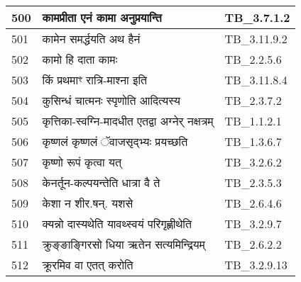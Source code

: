 \documentclass[17pt]{extarticle}
\begin{document}
\begin{longtable}{||p{0.4in}||p{4.9in}||p{0.9in}||}
    500 & कामप्रीता एनं कामा अनुप्रयान्ति & TB\_3.7.1.2       \\
    
    \hline
        
    501 & कामेन समर्द्धयति अथ हैनं & TB\_3.11.9.2       \\
    
    \hline
        
    502 & कामो हि दाता कामः & TB\_2.2.5.6       \\
    
    \hline
        
    503 & किं प्रथमाꣳ रात्रि{-}माश्ना इति & TB\_3.11.8.4       \\
    
    \hline
        
    504 & कुसिन्धं चात्मनः स्पृणोति आदित्यस्य & TB\_2.3.7.2       \\
    
    \hline
        
    505 & कृत्तिका{-}स्वग्नि{-}मादधीत एतद्वा अग्नेर् नक्षत्रम् & TB\_1.1.2.1       \\
    
    \hline
        
    506 & कृष्णलं कृष्णलं ॅवाजसृद्भ्यः प्रयच्छति & TB\_1.3.6.7       \\
    
    \hline
        
    507 & कृष्णो रूपं कृत्वा यत् & TB\_3.2.6.2       \\
    
    \hline
        
    508 & केनर्तून{-}कल्पयन्तेति धात्रा वै ते & TB\_2.3.5.3       \\
    
    \hline
        
    509 & केशा न शीर.षन्. यशसे & TB\_2.6.4.6       \\
    
    \hline
        
    510 & क्यन्नो दास्यथेति यावथ्स्वयं परिगृह्णीथेति & TB\_3.2.9.7       \\
    
    \hline
        
    511 & क्रुङ्ङाङ्गिरसो धिया ऋतेन सत्यमिन्द्रियम् & TB\_2.6.2.2       \\
    
    \hline
        
    512 & क्रूरमिव वा एतत् करोति & TB\_3.2.9.13       \\
    

\end{longtable}
\end{document}
